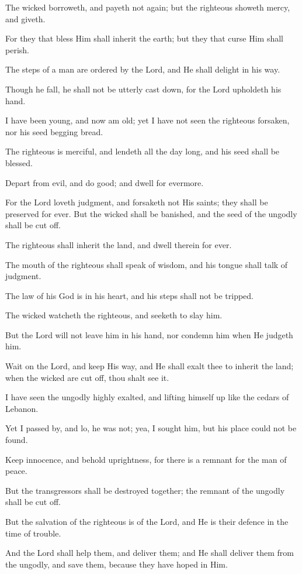 The wicked borroweth, and payeth not again; but the righteous showeth mercy, and giveth.

For they that bless Him shall inherit the earth; but they that curse Him shall perish.

The steps of a man are ordered by the Lord, and He shall delight in his way.

Though he fall, he shall not be utterly cast down, for the Lord upholdeth his hand.

I have been young, and now am old; yet I have not seen the righteous forsaken, nor his seed begging bread.

The righteous is merciful, and lendeth all the day long, and his seed shall be blessed.

Depart from evil, and do good; and dwell for evermore.

For the Lord loveth judgment, and forsaketh not His saints; they shall be preserved for ever. But the wicked shall be banished, and the seed of the ungodly shall be cut off.

The righteous shall inherit the land, and dwell therein for ever.

The mouth of the righteous shall speak of wisdom, and his tongue shall talk of judgment.

The law of his God is in his heart, and his steps shall not be tripped.

The wicked watcheth the righteous, and seeketh to slay him.

But the Lord will not leave him in his hand, nor condemn him when He judgeth him.

Wait on the Lord, and keep His way, and He shall exalt thee to inherit the land; when the wicked are cut off, thou shalt see it.

I have seen the ungodly highly exalted, and lifting himself up like the cedars of Lebanon.

Yet I passed by, and lo, he was not; yea, I sought him, but his place could not be found.

Keep innocence, and behold uprightness, for there is a remnant for the man of peace.

But the transgressors shall be destroyed together; the remnant of the ungodly shall be cut off.

But the salvation of the righteous is of the Lord, and He is their defence in the time of trouble.

And the Lord shall help them, and deliver them; and He shall deliver them from the ungodly, and save them, because they have hoped in Him.
